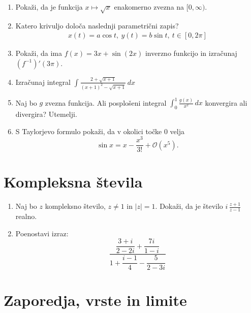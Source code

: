 \documentclass[a4paper,12pt]{article}
\begin{document}
\begin{enumerate}
\item
Pokaži, da je funkcija \(x \mapsto \sqrt{x}\) enakomerno zvezna na \([0, \infty)\).

\item
Katero krivuljo določa naslednji parametrični zapis?
\begin{align*}
x(t) = a \cos t, \ %
y(t) = b \sin t, \ %
t \in [0, 2 \pi]    
\end{align*}


\item
Pokaži, da ima \(f(x) = 3x + \sin(2x)\) inverzno funkcijo in izračunaj \((f^{-1})'(3\pi)\).

\item
Izračunaj integral
\(\displaystyle \int \frac{2+\sqrt{x+1}}{(x+1)^2-\sqrt{x+1}} \, dx\)


\item
Naj bo \(g\) zvezna funkcija. Ali posplošeni integral
\(\int_{0}^{1}\frac{g(x)}{x^2} \, dx\)
konvergira ali divergira? Utemelji.

\item
S Taylorjevo formulo pokaži, da v okolici točke \(0\) velja
\[
\sin x = x - \frac{x^3}{3!} + \mathcal{O}(x^5).
\]
\end{enumerate}

\section*{Kompleksna števila}

\begin{enumerate}
\item
Naj bo \(z\) kompleksno število, \(z \ne 1\) in \(|z| = 1\).
Dokaži, da je število \( i \, \frac{z+1}{z-1} \) realno.

\item
Poenostavi izraz:
\[
\frac{\dfrac{3+i}{2-2i}+\dfrac{7i}{1-i}}{1+\dfrac{i-1}{4}-\dfrac{5}{2-3i}}
\]
\end{enumerate}

\section*{Zaporedja, vrste in limite}
\end{document}
